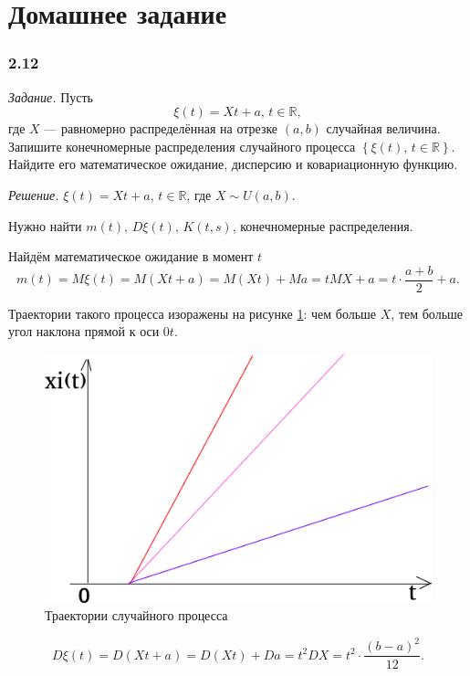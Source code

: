 \section*{Домашнее задание}

\subsubsection*{2.12}

\textit{Задание.}
Пусть
$$ \xi \left( t \right) =
  Xt + a, \,
  t \in \mathbb{R},$$
где $X$ --- равномерно распределённая на отрезке $ \left( a, b \right) $ случайная величина.
Запишите конечномерные распределения случайного процесса
$ \left\{ \xi \left( t \right), \, t \in \mathbb{R} \right\} $.
Найдите его математическое ожидание, дисперсию и ковариационную функцию.

\textit{Решение.}
$ \xi \left( t \right) = Xt + a, \, t \in \mathbb{R}$, где $X \sim U \left( a, b \right) $.

Нужно найти $m \left( t \right), \, D \xi \left( t \right), \, K \left( t, s \right) $,
конечномерные распределения.

Найдём математическое ожидание в момент $t$
$$m \left( t \right) =
  M \xi \left( t \right) =
  M \left( Xt + a \right) =
  M \left( Xt \right) + Ma =
  tMX + a =
  t \cdot \frac{a + b}{2} + a.$$

Траектории такого процесса изоражены на рисунке \ref{fig:212}: чем больше $X$,
тем больше угол наклона прямой к оси $0t$.

\begin{figure}[h!]
 \centering
 \includegraphics[width=.5\textwidth]{./pictures/2_12.png}
 \caption{Траектории случайного процесса}
 \label{fig:212}
\end{figure}

$$D \xi \left( t \right) =
  D \left( Xt + a \right) =
  D \left( Xt \right) + Da =
  t^2 DX =
  t^2 \cdot \frac{ \left( b - a \right)^2}{12}.$$


